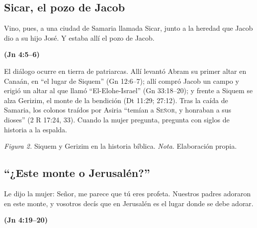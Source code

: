 \documentclass[11pt,letterpaper]{article}
\newcommand{\SENOR}{\textsc{Señor}}
\newcommand{\fuente}[1]{\par\hfill{\upshape\bfseries\small\textcolor{azul}{#1}}}
\begin{document}
\subsection{Sicar, el pozo de Jacob}

\begin{cita}Vino, pues, a una ciudad de Samaria llamada Sicar, junto a la heredad que Jacob dio a su hijo José. Y estaba allí el pozo de Jacob.\fuente{(Jn 4:5--6)}\end{cita}

El diálogo ocurre en tierra de patriarcas. Allí levantó Abram su primer altar en Canaán, en ``el lugar de Siquem'' (Gn 12:6--7); allí compró Jacob un campo y erigió un altar al que llamó ``El-Elohe-Israel'' (Gn 33:18--20); y frente a Siquem se alza Gerizim, el monte de la bendición (Dt 11:29; 27:12). Tras la caída de Samaria, los colonos traídos por Asiria ``temían a \SENOR, y honraban a sus dioses'' (2 R 17:24, 33). Cuando la mujer pregunta, pregunta con siglos de historia a la espalda.

\begin{center}
\par
{\footnotesize\color{gris}\textit{Figura 2.} Siquem y Gerizim en la historia bíblica. \textit{Nota.} Elaboración propia.}
\end{center}

\subsection{``¿Este monte o Jerusalén?''}

\begin{cita}Le dijo la mujer: Señor, me parece que tú eres profeta. Nuestros padres adoraron en este monte, y vosotros decís que en Jerusalén es el lugar donde se debe adorar.\fuente{(Jn 4:19--20)}\end{cita}
\end{document}
